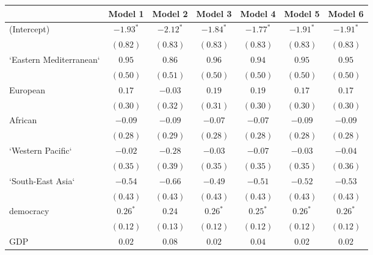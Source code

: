 
\begin{table}[!h]
\begin{center}
\begin{tabular}{l c c c c c c }
\toprule
 & Model 1 & Model 2 & Model 3 & Model 4 & Model 5 & Model 6 \\
\midrule
(Intercept)             & $-1.93^{*}$  & $-2.12^{*}$  & $-1.84^{*}$  & $-1.77^{*}$  & $-1.91^{*}$  & $-1.91^{*}$  \\
                        & $(0.82)$     & $(0.83)$     & $(0.83)$     & $(0.83)$     & $(0.83)$     & $(0.83)$     \\
`Eastern Mediterranean` & $0.95$       & $0.86$       & $0.96$       & $0.94$       & $0.95$       & $0.95$       \\
                        & $(0.50)$     & $(0.51)$     & $(0.50)$     & $(0.50)$     & $(0.50)$     & $(0.50)$     \\
European                & $0.17$       & $-0.03$      & $0.19$       & $0.19$       & $0.17$       & $0.17$       \\
                        & $(0.30)$     & $(0.32)$     & $(0.31)$     & $(0.30)$     & $(0.30)$     & $(0.30)$     \\
African                 & $-0.09$      & $-0.09$      & $-0.07$      & $-0.07$      & $-0.09$      & $-0.09$      \\
                        & $(0.28)$     & $(0.29)$     & $(0.28)$     & $(0.28)$     & $(0.28)$     & $(0.28)$     \\
`Western Pacific`       & $-0.02$      & $-0.28$      & $-0.03$      & $-0.07$      & $-0.03$      & $-0.04$      \\
                        & $(0.35)$     & $(0.39)$     & $(0.35)$     & $(0.35)$     & $(0.35)$     & $(0.36)$     \\
`South-East Asia`       & $-0.54$      & $-0.66$      & $-0.49$      & $-0.51$      & $-0.52$      & $-0.53$      \\
                        & $(0.43)$     & $(0.43)$     & $(0.43)$     & $(0.43)$     & $(0.43)$     & $(0.43)$     \\
democracy               & $0.26^{*}$   & $0.24$       & $0.26^{*}$   & $0.25^{*}$   & $0.26^{*}$   & $0.26^{*}$   \\
                        & $(0.12)$     & $(0.13)$     & $(0.12)$     & $(0.12)$     & $(0.12)$     & $(0.12)$     \\
GDP                     & $0.02$       & $0.08$       & $0.02$       & $0.04$       & $0.02$       & $0.02$       \\

\end{tabular}
\end{center}
\end{table}
